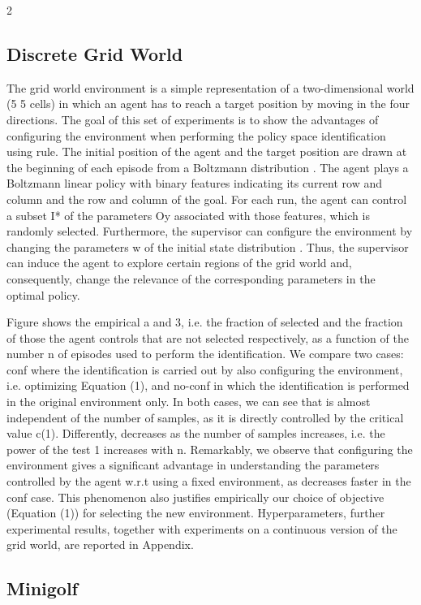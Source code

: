 \documentclass{article}
\begin{document}
\begin{paracol}{2}
\subsection*{Discrete Grid World}


The grid world environment is a simple representation of a
two-dimensional world (5  5 cells) in which an agent has to
reach a target position by moving in the four directions. The
goal of this set of experiments is to show the advantages
of configuring the environment when performing the policy space identification using rule. The initial position of the
agent and the target position are drawn at the beginning of
each episode from a Boltzmann distribution . The agent
plays a Boltzmann linear policy  with binary features  indicating its current row and column and the row and column
of the goal. For each run, the agent can control a subset I*
of the parameters Oy associated with those features, which
is randomly selected. Furthermore, the supervisor can configure the environment by changing the parameters w of the
initial state distribution . Thus, the supervisor can induce
the agent to explore certain regions of the grid world and,
consequently, change the relevance of the corresponding parameters in the optimal policy.

\switchcolumn
\RaggedRight

Figure shows the empirical a and 3, i.e. the fraction of
selected and the fraction of those the agent controls that are
not selected respectively, as a function of the number n of
episodes used to perform the identification. We compare two
cases: conf where the identification is carried out by also
configuring the environment, i.e. optimizing Equation (1),
and no-conf in which the identification is performed in the
original environment only. In both cases, we can see that
 is almost independent of the number of samples, as it is
directly controlled by the critical value c(1). Differently, 
decreases as the number of samples increases, i.e. the power
of the test 1   increases with n. Remarkably, we observe
that configuring the environment gives a significant advantage in understanding the parameters controlled by the agent
w.r.t using a fixed environment, as  decreases faster in the
conf case. This phenomenon also justifies empirically our
choice of objective (Equation (1)) for selecting the new environment. Hyperparameters, further experimental results, together with experiments on a continuous version of the grid
world, are reported in Appendix.


\subsection*{Minigolf}



\end{paracol}
\end{document}
